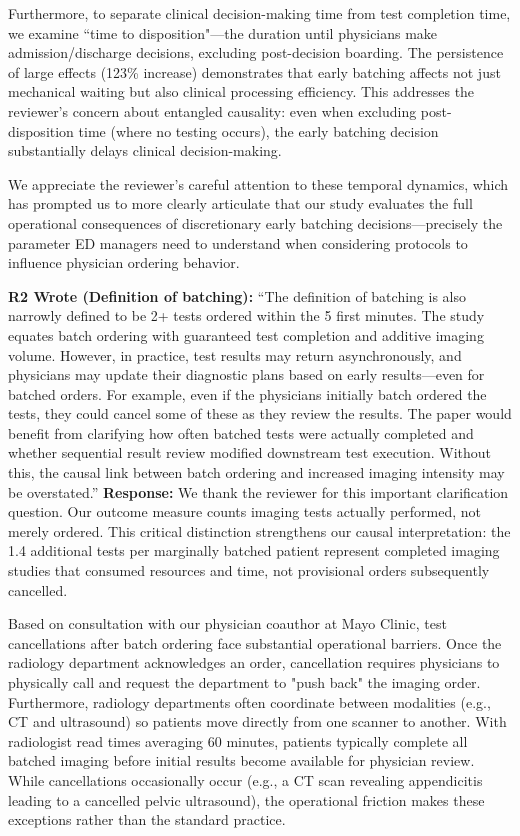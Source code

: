 \documentclass[11pt]{article}
\newenvironment{quote2}
{ \bigskip
\noindent
         \small\em
         \baselineskip=14pt
}
\newcommand{\1}{\hbox{\rm 1\kern-.35em 1}}
\begin{document}
{{Furthermore, to separate clinical decision-making time from test completion time, we examine ``time to disposition"—the duration until physicians make admission/discharge decisions, excluding post-decision boarding. The persistence of large effects (123\% increase) demonstrates that early batching affects not just mechanical waiting but also clinical processing efficiency. This addresses the reviewer's concern about entangled causality: even when excluding post-disposition time (where no testing occurs), the early batching decision substantially delays clinical decision-making.

We appreciate the reviewer's careful attention to these temporal dynamics, which has prompted us to more clearly articulate that our study evaluates the full operational consequences of discretionary early batching decisions—precisely the parameter ED managers need to understand when considering protocols to influence physician ordering behavior.
\color{black}


\begin{quote2}
\textbf{R2 Wrote (Definition of batching):}  
“The definition of batching is also narrowly defined to be 2+
tests ordered within the 5 first minutes. The study equates batch ordering with
guaranteed test completion and additive imaging volume. However, in practice, test
results may return asynchronously, and physicians may update their diagnostic plans
based on early results—even for batched orders. For example, even if the physicians
initially batch ordered the tests, they could cancel some of these as they review the
results. The paper would benefit from clarifying how often batched tests were actually
completed and whether sequential result review modified downstream test execution.
Without this, the causal link between batch ordering and increased imaging intensity
may be overstated.” 
\end{quote2}

\noindent\textbf{Response:} \color{blue}
We thank the reviewer for this important clarification question. Our outcome measure counts imaging tests actually performed, not merely ordered. This critical distinction strengthens our causal interpretation: the 1.4 additional tests per marginally batched patient represent completed imaging studies that consumed resources and time, not provisional orders subsequently cancelled.

Based on consultation with our physician coauthor at Mayo Clinic, test cancellations after batch ordering face substantial operational barriers. Once the radiology department acknowledges an order, cancellation requires physicians to physically call and request the department to "push back" the imaging order. Furthermore, radiology departments often coordinate between modalities (e.g., CT and ultrasound) so patients move directly from one scanner to another. With radiologist read times averaging 60 minutes, patients typically complete all batched imaging before initial results become available for physician review. While cancellations occasionally occur (e.g., a CT scan revealing appendicitis leading to a cancelled pelvic ultrasound), the operational friction makes these exceptions rather than the standard practice.

}}
\end{document}
